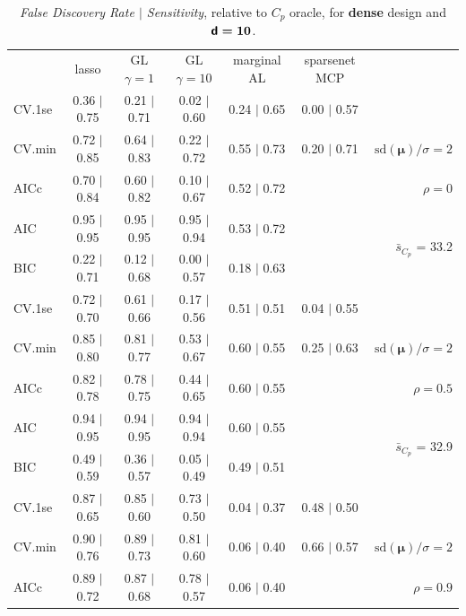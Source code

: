 \documentclass[12pt]{article}
\newcommand{\mr}[1]{\mathrm{#1}}
\newcommand{\bm}[1]{\mathbf{#1}}
\begin{document}
\begin{table}[p]\vspace{-.5cm}
\caption[l]{ {\it False Discovery Rate $\mid$ Sensitivity}, 
relative to $C_p$ oracle, for {\bf dense} design and $\boldsymbol{{\sf d}=10}$.}
\vspace{-.5cm}
\small{}
\begin{center}
\begin{tabular}{l*{5}{c}|r}
 & lasso & GL $\gamma=1$ & GL $\gamma=10$ & marginal AL & sparsenet MCP  & \\
 \cline{1-7}
CV.1se & 0.36 $\mid$ 0.75 & 0.21 $\mid$ 0.71 & 0.02 $\mid$ 0.60 & 0.24 $\mid$ 0.65 & 0.00 $\mid$ 0.57 &\\
CV.min & 0.72 $\mid$ 0.85 & 0.64 $\mid$ 0.83 & 0.22 $\mid$ 0.72 & 0.55 $\mid$ 0.73 & 0.20 $\mid$ 0.71 &  $\mr{sd}(\bm{\mu})/\sigma=2$ \\
AICc & 0.70 $\mid$ 0.84 & 0.60 $\mid$ 0.82 & 0.10 $\mid$ 0.67 & 0.52 $\mid$ 0.72 & & $\rho=0$ \\
AIC & 0.95 $\mid$ 0.95 & 0.95 $\mid$ 0.95 & 0.95 $\mid$ 0.94 & 0.53 $\mid$ 0.72 & & \multirow{2}{*}{$\bar{s}_{C_p}$ = 33.2} \\
BIC & 0.22 $\mid$ 0.71 & 0.12 $\mid$ 0.68 & 0.00 $\mid$ 0.57 & 0.18 $\mid$ 0.63 & & \\
 \hline 
CV.1se & 0.72 $\mid$ 0.70 & 0.61 $\mid$ 0.66 & 0.17 $\mid$ 0.56 & 0.51 $\mid$ 0.51 & 0.04 $\mid$ 0.55 &\\
CV.min & 0.85 $\mid$ 0.80 & 0.81 $\mid$ 0.77 & 0.53 $\mid$ 0.67 & 0.60 $\mid$ 0.55 & 0.25 $\mid$ 0.63 &  $\mr{sd}(\bm{\mu})/\sigma=2$ \\
AICc & 0.82 $\mid$ 0.78 & 0.78 $\mid$ 0.75 & 0.44 $\mid$ 0.65 & 0.60 $\mid$ 0.55 & & $\rho=0.5$ \\
AIC & 0.94 $\mid$ 0.95 & 0.94 $\mid$ 0.95 & 0.94 $\mid$ 0.94 & 0.60 $\mid$ 0.55 & & \multirow{2}{*}{$\bar{s}_{C_p}$ = 32.9} \\
BIC & 0.49 $\mid$ 0.59 & 0.36 $\mid$ 0.57 & 0.05 $\mid$ 0.49 & 0.49 $\mid$ 0.51 & & \\
 \hline 
CV.1se & 0.87 $\mid$ 0.65 & 0.85 $\mid$ 0.60 & 0.73 $\mid$ 0.50 & 0.04 $\mid$ 0.37 & 0.48 $\mid$ 0.50 &\\
CV.min & 0.90 $\mid$ 0.76 & 0.89 $\mid$ 0.73 & 0.81 $\mid$ 0.60 & 0.06 $\mid$ 0.40 & 0.66 $\mid$ 0.57 &  $\mr{sd}(\bm{\mu})/\sigma=2$ \\
AICc & 0.89 $\mid$ 0.72 & 0.87 $\mid$ 0.68 & 0.78 $\mid$ 0.57 & 0.06 $\mid$ 0.40 & & $\rho=0.9$ \\

\end{tabular}
\end{center}
\end{table}
\end{document}
